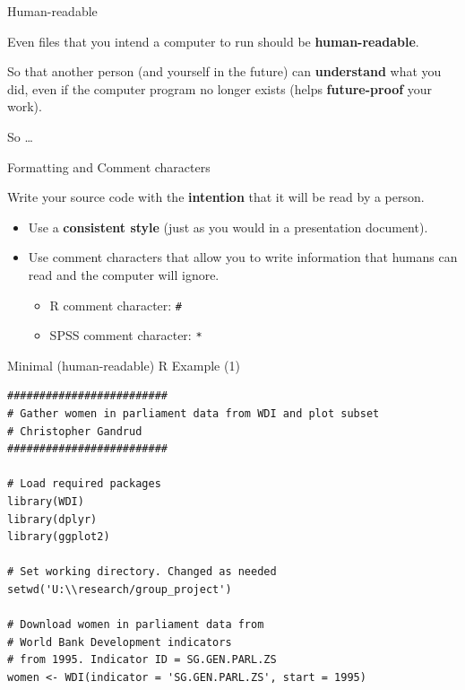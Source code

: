 \documentclass[10pt]{beamer}
\begin{document}
\begin{frame}{Human-readable}

    Even files that you intend a computer to run should be \textbf{human-readable}.

    \vspace{1.5cm}

    So that another person (and yourself in the future) can \textbf{understand} what you did, even if the computer program no longer exists (helps \textbf{future-proof} your work).

    \vspace{0.5cm}

    So \ldots

\end{frame}

\begin{frame}{Formatting and Comment characters}

    Write your source code with the \textbf{intention} that it will be read by a person.

    \begin{itemize}
        \item Use a \textbf{consistent style} (just as you would in a presentation document).

        \item Use \alert{comment characters} that allow you to write information that humans can read and the computer will ignore.

            \begin{itemize}
                \item R comment character: \texttt{\#}
                \item SPSS comment character: \texttt{*}
            \end{itemize}
    \end{itemize}


\end{frame}

\begin{frame}[fragile]{Minimal (human-readable) R Example (1)}

\begin{lstlisting}
#########################
# Gather women in parliament data from WDI and plot subset
# Christopher Gandrud
#########################

# Load required packages
library(WDI)
library(dplyr)
library(ggplot2)

# Set working directory. Changed as needed
setwd('U:\\research/group_project')

# Download women in parliament data from
# World Bank Development indicators
# from 1995. Indicator ID = SG.GEN.PARL.ZS
women <- WDI(indicator = 'SG.GEN.PARL.ZS', start = 1995)
\end{lstlisting}

\end{frame}
\end{document}
